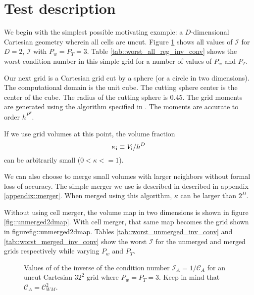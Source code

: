 \documentclass{article}
\newcommand{\ibold}{{\bf i}}
\newcommand{\cali}{\mathcal{I}}
\newcommand{\calc}{\mathcal{C}}
\begin{document}
\section{Test description}
\label{sec::eb}

We begin with the simplest possible motivating example: a
$D$-dimensional Cartesian geometry wherein all cells are uncut.
Figure \ref{fig::T3W3} shows all values of $\cali$ for $D=2$, $\cali$ with
$P_w = P_T = 3$.  Table \ref{tab::worst_all_reg_inv_conv} shows the
worst condition number in this simple grid for a number of values of
$P_w$ and $P_T$.    

Our next  grid is a Cartesian grid cut  by a sphere (or a circle in two
dimensions). The computational domain is the unit cube.   The cutting
sphere center is the center of the cube.   The radius of the cutting
sphere is 0.45.  The grid moments are generated using the algorithm
specified in \cite{Schwartz2015}.  The moments are accurate to
order $h^{P^T}$.

If we use grid volumes at this point, the volume fraction
\begin{equation*}
\kappa_\ibold \equiv V_\ibold/h^D 
\end{equation*}
can be arbitrarily small ($ 0 < \kappa <= 1$).

We can also choose to
merge small volumes with larger neighbors without formal loss of
accuracy. The simple merger we use is described in
described in appendix \ref{appendix::merger}.
When merged using this algorithm, $\kappa$ can be larger than $2^D$.

Without using cell merger, the volume map in two dimensions is shown
in figure \ref{fig::unmerged2dmap}.   With cell merger, that same map
becomes the grid shown in figure{fig::unmerged2dmap}.
Tables \ref{tab::worst_unmerged_inv_conv} and
\ref{tab::worst_merged_inv_conv}
show the worst $\cali$ for the unmerged and merged  grids
respectively while varying $P_w$ and $P_T$.   

\begin{figure}
\centerline{ }
\label{fig::T3W3}
\caption
    {   Values of of the inverse of the condition number
      $\cali_A = 1/\calc_A$
      for an uncut Cartesian $32^2$
      grid where $P_w = P_T = 3$.
      Keep in mind that $\calc_A = \calc^2_{WM}$.
    }
\end{figure}
\end{document}
